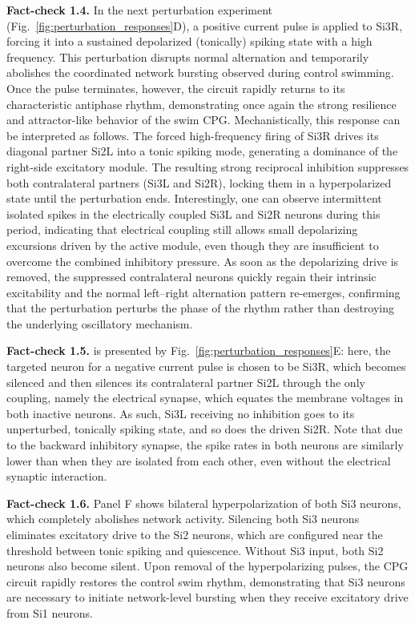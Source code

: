 \documentclass[nofootinbib,aip,amsmath,amssymb,preprint,twocolumn,floatfix,10pt]{revtex4-2}
\begin{document}
{\bf Fact-check 1.4.} In the next perturbation experiment (Fig.~\ref{fig:perturbation_responses}D), a positive current pulse is applied to Si3R, forcing it into a sustained depolarized (tonically) spiking state with a high frequency. This perturbation disrupts normal alternation and temporarily abolishes the coordinated network bursting observed during control swimming. Once the pulse terminates, however, the circuit rapidly returns to its characteristic antiphase rhythm, demonstrating once again the strong resilience and attractor-like behavior of the swim CPG.
Mechanistically, this response can be interpreted as follows. The forced high-frequency firing of Si3R drives its diagonal partner Si2L into a tonic spiking mode, generating a dominance of the right-side excitatory module. The resulting strong reciprocal inhibition suppresses both contralateral partners (Si3L and Si2R), locking them in a hyperpolarized state until the perturbation ends. Interestingly, one can observe intermittent isolated spikes in the electrically coupled Si3L and Si2R neurons during this period, indicating that electrical coupling still allows small depolarizing excursions driven by the active module, even though they are insufficient to overcome the combined inhibitory pressure. As soon as the depolarizing drive is removed, the suppressed contralateral neurons quickly regain their intrinsic excitability and the normal left--right alternation pattern re-emerges, confirming that the perturbation perturbs the phase of the rhythm rather than destroying the underlying oscillatory mechanism.



{\bf Fact-check 1.5.} is presented by Fig.~\ref{fig:perturbation_responses}E: here, the targeted neuron for a negative current pulse is chosen to be Si3R, which becomes silenced and then silences its contralateral partner Si2L through the only coupling, namely the electrical synapse, which equates the membrane voltages in both inactive neurons. As such, Si3L receiving no inhibition goes to its unperturbed, tonically spiking state, and so does the driven Si2R. Note that due to the backward inhibitory synapse, the spike rates in both neurons are similarly lower than when they are isolated from each other, even without the electrical synaptic interaction.

{\bf Fact-check 1.6.}
Panel F shows bilateral hyperpolarization of both Si3 neurons, which completely abolishes network activity. Silencing both Si3 neurons eliminates excitatory drive to the Si2 neurons, which are configured near the threshold between tonic spiking and quiescence. Without Si3 input, both Si2 neurons also become silent. Upon removal of the hyperpolarizing pulses, the CPG circuit rapidly restores the control swim rhythm, demonstrating that Si3 neurons are necessary to initiate network-level bursting when they receive excitatory drive from Si1 neurons.
\end{document}
